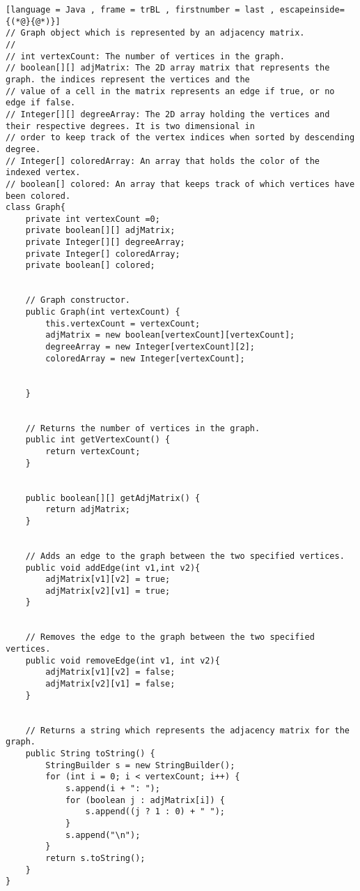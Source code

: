 \documentclass[12pt, letterpaper]{article}
\begin{document}
\begin{lstlisting}[language = Java , frame = trBL , firstnumber = last , escapeinside={(*@}{@*)}]
// Graph object which is represented by an adjacency matrix.
//
// int vertexCount: The number of vertices in the graph.
// boolean[][] adjMatrix: The 2D array matrix that represents the graph. the indices represent the vertices and the
// value of a cell in the matrix represents an edge if true, or no edge if false.
// Integer[][] degreeArray: The 2D array holding the vertices and their respective degrees. It is two dimensional in
// order to keep track of the vertex indices when sorted by descending degree.
// Integer[] coloredArray: An array that holds the color of the indexed vertex.
// boolean[] colored: An array that keeps track of which vertices have been colored.
class Graph{
    private int vertexCount =0;
    private boolean[][] adjMatrix;
    private Integer[][] degreeArray;
    private Integer[] coloredArray;
    private boolean[] colored;


    // Graph constructor.
    public Graph(int vertexCount) {
        this.vertexCount = vertexCount;
        adjMatrix = new boolean[vertexCount][vertexCount];
        degreeArray = new Integer[vertexCount][2];
        coloredArray = new Integer[vertexCount];


    }


    // Returns the number of vertices in the graph.
    public int getVertexCount() {
        return vertexCount;
    }


    public boolean[][] getAdjMatrix() {
        return adjMatrix;
    }


    // Adds an edge to the graph between the two specified vertices.
    public void addEdge(int v1,int v2){
        adjMatrix[v1][v2] = true;
        adjMatrix[v2][v1] = true;
    }


    // Removes the edge to the graph between the two specified vertices.
    public void removeEdge(int v1, int v2){
        adjMatrix[v1][v2] = false;
        adjMatrix[v2][v1] = false;
    }


    // Returns a string which represents the adjacency matrix for the graph.
    public String toString() {
        StringBuilder s = new StringBuilder();
        for (int i = 0; i < vertexCount; i++) {
            s.append(i + ": ");
            for (boolean j : adjMatrix[i]) {
                s.append((j ? 1 : 0) + " ");
            }
            s.append("\n");
        }
        return s.toString();
    }
}
\end{lstlisting}
\end{document}
